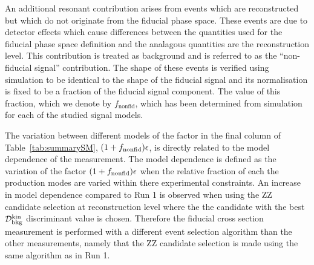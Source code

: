 An  additional resonant contribution arises from events which are reconstructed but which do not originate from the fiducial phase space. These events are due to detector effects which cause differences between the quantities used for the fiducial phase space definition and the analagous quantities are the reconstruction level. This contribution is treated as background and is referred to as the ``non-fiducial signal'' contribution. The shape of these events is verified using simulation to be identical to the shape of the fiducial signal and its normalisation is fixed to be a fraction of the fiducial signal component. The value of this fraction, which we denote by $f_{\mathrm{nonfid}}$, which has been determined from simulation for each of the studied signal models. 

The variation between different models of the factor in the final column of Table~\ref{tab:summarySM}, $(1+f_{\rm{nonfid}})\epsilon$, is directly related to the model dependence of the measurement. 
The model dependence is defined as the variation of the factor $(1+f_{\rm{nonfid}})\epsilon$ when the relative fraction of each the production modes are varied within there experimental constraints. An increase in model dependence compared to Run 1 is observed when using the ZZ candidate selection at reconstruction level where the the candidate with the best ${\cal D}^{\rm kin}_{\rm bkg}$ discriminant value is chosen. Therefore the fiducial cross section measurement is performed with a different event selection algorithm than the other measurements, namely that the ZZ candidate selection is made using the same algorithm as in Run 1. 

